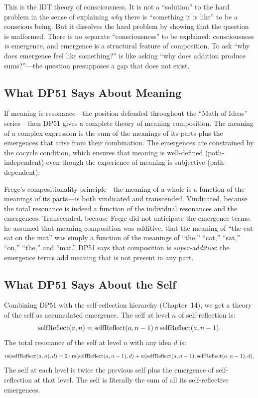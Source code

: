 This is the IDT theory of consciousness.  It is not a ``solution'' to the
hard problem in the sense of explaining \emph{why} there is ``something it is
like'' to be a conscious being.  But it dissolves the hard problem by showing
that the question is malformed.  There is no separate ``consciousness'' to be
explained: consciousness \emph{is} emergence, and emergence is a structural
feature of composition.  To ask ``why does emergence feel like something?'' is
like asking ``why does addition produce sums?''---the question presupposes a
gap that does not exist.

\subsection{What DP51 Says About Meaning}

If meaning is resonance---the position defended throughout the ``Math of
Ideas'' series---then DP51 gives a complete theory of meaning composition.
The meaning of a complex expression is the sum of the meanings of its parts
plus the emergences that arise from their combination.  The emergences are
constrained by the cocycle condition, which ensures that meaning is
well-defined (path-independent) even though the experience of meaning is
subjective (path-dependent).

Frege's compositionality principle---the meaning of a whole is a function
of the meanings of its parts---is both vindicated and transcended.
Vindicated, because the total resonance is indeed a function of the
individual resonances and the emergences.  Transcended, because Frege did
not anticipate the emergence terms: he assumed that meaning composition was
additive, that the meaning of ``the cat sat on the mat'' was simply a
function of the meanings of ``the,'' ``cat,'' ``sat,'' ``on,'' ``the,'' and
``mat.''  DP51 says that composition is \emph{super-additive}: the emergence
terms add meaning that is not present in any part.

\subsection{What DP51 Says About the Self}

Combining DP51 with the self-reflection hierarchy (Chapter~14), we get a
theory of the self as accumulated emergence.  The self at level $n$ of
self-reflection is:
\[
\mathrm{selfReflect}(a, n)
= \mathrm{selfReflect}(a, n-1) \circ \mathrm{selfReflect}(a, n-1).
\]
The total resonance of the self at level $n$ with any idea $d$ is:
\[
\mathrm{rs}(\mathrm{selfReflect}(a, n), d)
= 2 \cdot \mathrm{rs}(\mathrm{selfReflect}(a, n-1), d)
  + \kappa(\mathrm{selfReflect}(a, n-1),
            \mathrm{selfReflect}(a, n-1), d).
\]
The self at each level is twice the previous self plus the emergence of
self-reflection at that level.  The self is literally the sum of all its
self-reflective emergences.

